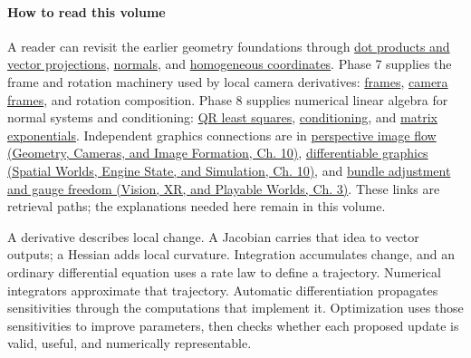 \hypertarget{01-foundations-i-ch020-from-local-change-to-reliable-motion-calculus-and-optimization}{}

\paragraph{How to read this volume}\label{01-foundations-i-ch020-how-to-read-this-volume}

\hypertarget{01-foundations-i-ch020-how-to-read-this-volume}{}

A reader can revisit the earlier geometry foundations through \hyperref[01-foundations-i-ch017-the-dot-product-turns-two-movements-into-a-measurement]{dot products and vector projections}, \hyperref[01-foundations-i-ch018-a-normal-is-a-measuring-rule-before-it-is-an-arrow]{normals}, and \hyperref[01-foundations-i-ch018-homogeneous-coordinates-preserve-the-role-of-a-location]{homogeneous coordinates}. Phase 7 supplies the frame and rotation machinery used by local camera derivatives: \hyperref[01-foundations-i-ch018-a-frame-combines-directions-with-a-place-to-stand]{frames}, \hyperref[01-foundations-i-ch019-a-camera-is-another-frame-so-viewing-uses-its-inverse]{camera frames}, and {rotation composition}. Phase 8 supplies numerical linear algebra for normal systems and conditioning: \hyperref[01-foundations-i-ch020-qr-turns-least-squares-into-a-triangular-solve-plus-an-irreducible-residual]{QR least squares}, \hyperref[02-foundations-ii-ch024-conditioning-weak-singular-directions-amplify-uncertainty]{conditioning}, and \hyperref[02-foundations-ii-ch026-the-exponential-solves-a-linear-differential-equation]{matrix exponentials}. Independent graphics connections are in \href{../03-Geometry-Cameras-and-Image-Formation/main.pdf\#nameddest=03-visual-computing-i-ch003-perspective-projection-links-3-d-velocity-to-image-flow}{perspective image flow (Geometry, Cameras, and Image Formation, Ch. 10)}, \href{../05-Spatial-Worlds-Engine-State-and-Simulation/main.pdf\#nameddest=04-visual-computing-ii-ch029-differentiating-through-a-graphics-pipeline}{differentiable graphics (Spatial Worlds, Engine State, and Simulation, Ch. 10)}, and \href{../07-Vision-XR-and-Playable-Worlds/main.pdf\#nameddest=04-visual-computing-ii-ch032-bundle-adjustment-objective-and-gauge}{bundle adjustment and gauge freedom (Vision, XR, and Playable Worlds, Ch. 3)}. These links are retrieval paths; the explanations needed here remain in this volume.

A derivative describes local change. A Jacobian carries that idea to vector outputs; a Hessian adds local curvature. Integration accumulates change, and an ordinary differential equation uses a rate law to define a trajectory. Numerical integrators approximate that trajectory. Automatic differentiation propagates sensitivities through the computations that implement it. Optimization uses those sensitivities to improve parameters, then checks whether each proposed update is valid, useful, and numerically representable.

